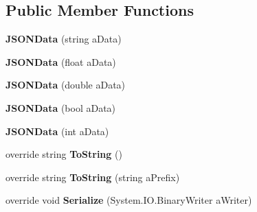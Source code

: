 \subsection*{Public Member Functions}
\begin{DoxyCompactItemize}
\item 
\hypertarget{class_simple_j_s_o_n_1_1_j_s_o_n_data_a5521cbe707cc8b3fa1d527b6fbbc5c63}{{\bfseries J\+S\+O\+N\+Data} (string a\+Data)}\label{class_simple_j_s_o_n_1_1_j_s_o_n_data_a5521cbe707cc8b3fa1d527b6fbbc5c63}

\item 
\hypertarget{class_simple_j_s_o_n_1_1_j_s_o_n_data_a88ddc9933f62668a84e70df12aed9841}{{\bfseries J\+S\+O\+N\+Data} (float a\+Data)}\label{class_simple_j_s_o_n_1_1_j_s_o_n_data_a88ddc9933f62668a84e70df12aed9841}

\item 
\hypertarget{class_simple_j_s_o_n_1_1_j_s_o_n_data_a6ee1d2d9e08f9d42fffa18a36def798e}{{\bfseries J\+S\+O\+N\+Data} (double a\+Data)}\label{class_simple_j_s_o_n_1_1_j_s_o_n_data_a6ee1d2d9e08f9d42fffa18a36def798e}

\item 
\hypertarget{class_simple_j_s_o_n_1_1_j_s_o_n_data_a620308161501aa77ba6302451c66e0cd}{{\bfseries J\+S\+O\+N\+Data} (bool a\+Data)}\label{class_simple_j_s_o_n_1_1_j_s_o_n_data_a620308161501aa77ba6302451c66e0cd}

\item 
\hypertarget{class_simple_j_s_o_n_1_1_j_s_o_n_data_aef911de6fe6627ddd360c0e13522ac09}{{\bfseries J\+S\+O\+N\+Data} (int a\+Data)}\label{class_simple_j_s_o_n_1_1_j_s_o_n_data_aef911de6fe6627ddd360c0e13522ac09}

\item 
\hypertarget{class_simple_j_s_o_n_1_1_j_s_o_n_data_a274e2c4fba6fafcec75668bf82cdac2c}{override string {\bfseries To\+String} ()}\label{class_simple_j_s_o_n_1_1_j_s_o_n_data_a274e2c4fba6fafcec75668bf82cdac2c}

\item 
\hypertarget{class_simple_j_s_o_n_1_1_j_s_o_n_data_a2cc02d5afee7e35b4b7f6e8d201d0b5f}{override string {\bfseries To\+String} (string a\+Prefix)}\label{class_simple_j_s_o_n_1_1_j_s_o_n_data_a2cc02d5afee7e35b4b7f6e8d201d0b5f}

\item 
\hypertarget{class_simple_j_s_o_n_1_1_j_s_o_n_data_a27d51e315c97a16a87f36fa0cdd4025a}{override void {\bfseries Serialize} (System.\+I\+O.\+Binary\+Writer a\+Writer)}\label{class_simple_j_s_o_n_1_1_j_s_o_n_data_a27d51e315c97a16a87f36fa0cdd4025a}

\end{DoxyCompactItemize}
